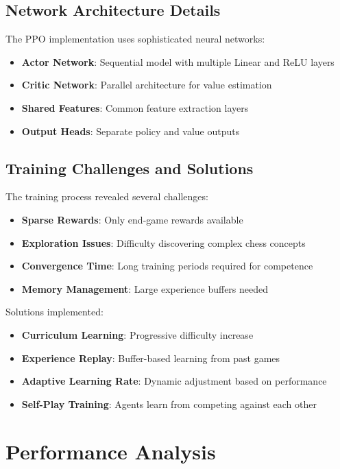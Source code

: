 \documentclass[11pt,a4paper]{report}
\begin{document}
\subsection{Network Architecture Details}
The PPO implementation uses sophisticated neural networks:

\begin{itemize}
    \item \textbf{Actor Network}: Sequential model with multiple Linear and ReLU layers
    \item \textbf{Critic Network}: Parallel architecture for value estimation
    \item \textbf{Shared Features}: Common feature extraction layers
    \item \textbf{Output Heads}: Separate policy and value outputs
\end{itemize}

\subsection{Training Challenges and Solutions}
The training process revealed several challenges:

\begin{itemize}
    \item \textbf{Sparse Rewards}: Only end-game rewards available
    \item \textbf{Exploration Issues}: Difficulty discovering complex chess concepts
    \item \textbf{Convergence Time}: Long training periods required for competence
    \item \textbf{Memory Management}: Large experience buffers needed
\end{itemize}

Solutions implemented:
\begin{itemize}
    \item \textbf{Curriculum Learning}: Progressive difficulty increase
    \item \textbf{Experience Replay}: Buffer-based learning from past games
    \item \textbf{Adaptive Learning Rate}: Dynamic adjustment based on performance
    \item \textbf{Self-Play Training}: Agents learn from competing against each other
\end{itemize}

\section{Performance Analysis}
\end{document}
